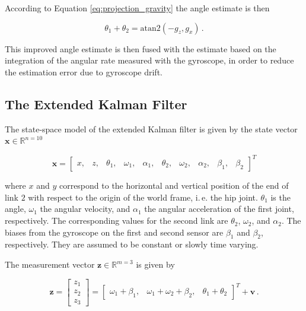 \noindent
According to Equation \ref{eq:projection_gravity} the angle estimate is then

\begin{equation}
  \theta_1 + \theta_2 = \mbox{atan}2(-g_z, g_x)\,.
\end{equation}

\noindent
This improved angle estimate is then fused with the estimate based on the integration of the angular rate measured with the gyroscope, in order to reduce the estimation error due to gyroscope drift.

\subsection{The Extended Kalman Filter} \label{sec:EKF_model}

The state-space model of the extended Kalman filter is given by the state vector $\mathbf{x} \in \mathbb{R}^{n=10}$

\begin{equation} \label{eq:state_vector}
  \mathbf{x} = \begin{bmatrix}
  	x, & z, & \theta_1, & \omega_1, & \alpha_1, & \theta_2, & \omega_2, & \alpha_2, & \beta_1, & \beta_2
  \end{bmatrix}^T
\end{equation}

\noindent
where $x$ and $y$ correspond to the horizontal and vertical position of the end of link $2$ with respect to the origin of the world frame, i.\,e. the hip joint. $\theta_1$ is the angle, $\omega_1$ the angular velocity, and $\alpha_1$ the angular acceleration of the first joint, respectively. The corresponding values for the second link are $\theta_2$, $\omega_2$, and $\alpha_2$. The biases from the gyroscope on the first and second sensor are $\beta_1$ and $\beta_2$, respectively. They are assumed to be constant or slowly time varying.

The measurement vector $\mathbf{z} \in \mathbb{R}^{m=3}$ is given by

\begin{equation} \label{eq:measurement_vector}
  \mathbf{z} = \begin{bmatrix} z_1 \\ z_2 \\ z_3 \end{bmatrix} = \begin{bmatrix}
  	\omega_1 + \beta_1, & \omega_1 + \omega_2 + \beta_2, & \theta_1 + \theta_2
  \end{bmatrix}^T + \mathbf{v}\,.
\end{equation}
 
